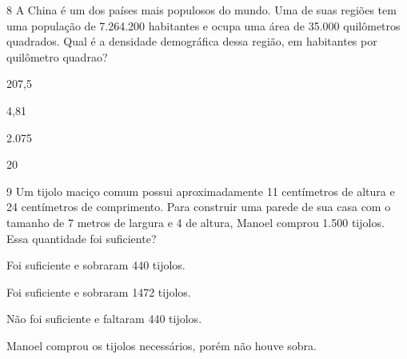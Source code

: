 \num{8} A China é um dos países mais populosos do mundo. Uma de suas regiões
tem uma população de 7.264.200 habitantes e ocupa uma área de 35.000 quilômetros quadrados. 
Qual é a densidade demográfica dessa região, em habitantes por quilômetro quadrao?

\begin{escolha}
\item 207,5
\item 4,81
\item 2.075
\item 20
\end{escolha}










\num{9} Um tijolo maciço comum possui aproximadamente 11 centímetros de
altura e 24 centímetros de comprimento. Para construir uma parede de sua
casa com o tamanho de 7 metros de largura e 4 de altura, Manoel comprou
1.500 tijolos. Essa quantidade foi suficiente?

\begin{escolha}
\item Foi suficiente e sobraram 440 tijolos.
\item Foi suficiente e sobraram 1472 tijolos.
\item Não foi suficiente e faltaram 440 tijolos.
\item Manoel comprou os tijolos necessários, porém não houve sobra.
\end{escolha}


